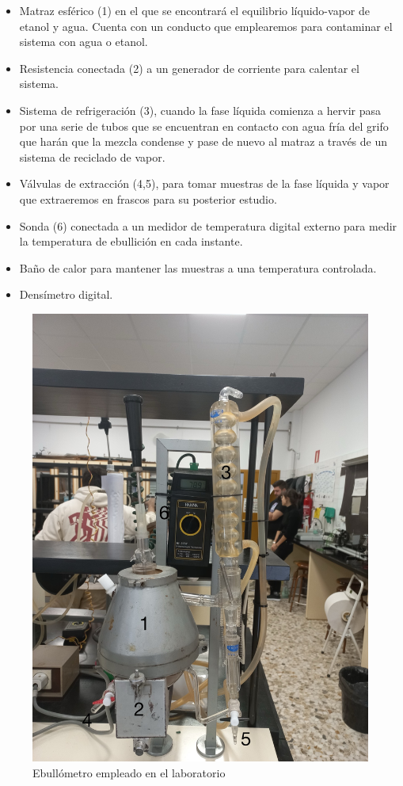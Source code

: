\documentclass[a4paper,12pt,titlepage]{article}
\begin{document}
\begin{itemize}
    \item Matraz esférico (1) en el que se encontrará el equilibrio líquido-vapor de etanol y agua. Cuenta con un conducto que emplearemos para contaminar el sistema con agua o etanol.
    \item Resistencia conectada (2) a un generador de corriente para calentar el sistema.
    \item Sistema de refrigeración (3), cuando la fase líquida comienza a hervir pasa por una serie de tubos que se encuentran en contacto con agua fría del grifo que harán que la mezcla condense y pase de nuevo al matraz a través de un sistema de reciclado de vapor.
    \item Válvulas de extracción (4,5), para tomar muestras de la fase líquida y vapor que extraeremos en frascos para su posterior estudio.
    \item Sonda (6) conectada a un medidor de temperatura digital externo para medir la temperatura de ebullición en cada instante.
    \item Baño de calor para mantener las muestras a una temperatura controlada.
    \item Densímetro digital.
\end{itemize}

\begin{figure}[h!]
    \centering
    \includegraphics[width=0.55\linewidth]{ELV binario/ebullometro.jpg}
    \caption{Ebullómetro empleado en el laboratorio}
    \label{fig:enter-label}
\end{figure}
\end{document}
